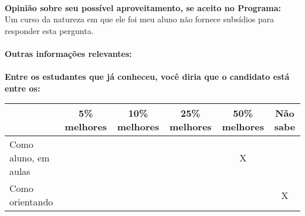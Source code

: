 \documentclass[11pt]{article}
\begin{document}
\\
\textbf{Opinião sobre seu possível aproveitamento, se aceito no Programa:}
\\Um curso da natureza em que ele foi meu aluno não fornece subsídios para responder esta pergunta.\\ 
\\
\textbf{Outras informações relevantes:} \\
\\[0.3cm]
\textbf{Entre os estudantes que já conheceu, você diria que o candidato está entre os:}
\\
\begin{tabular}{|l|c|c|c|c|c|}
\hline
 & 5\% melhores & 10\% melhores & 25\% melhores & 50\% melhores & Não sabe \\
\hline
Como aluno, em aulas &  &  &  & X & \\
\hline
Como orientando &  &  &  &  & X\\
\hline
\end{tabular}
\end{document}

